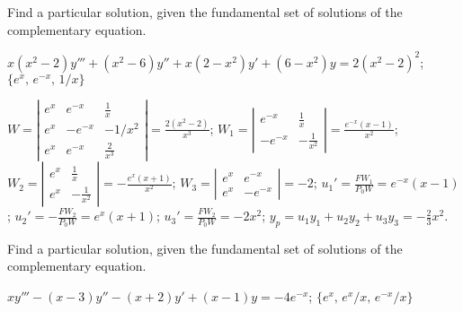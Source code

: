 \documentclass{ximera}
\begin{document}
\begin{problem}\label{exer:9.4.6}
Find a particular
solution, given the fundamental set of solutions of the complementary equation.

$x(x^2-2)y'''+(x^2-6)y''+x(2-x^2)y'+(6-x^2)y=2(x^2-2)^2$; \quad
 $\{e^x,\,e^{-x},\,1/x\}$

\begin{solution}
$W=\left|\begin{array}{cccc}
e^x&e^{-x}&\frac{1}{x}\\
e^x&-e^{-x}&-{1/x^2}\\e^x&e^{-x}&\frac{2}{x^3}
\end{array}\right|=\frac{2(x^2-2)}{x^3}$;
$W_1=\left|\begin{array}{cccc}
e^{-x}&\frac{1}{x}\\-e^{-x}&-\frac{1}{x^2}
\end{array}\right|=\frac{e^{-x}(x-1)}{x^2}$;
$W_2=\left|\begin{array}{cccc}
e^x&\frac{1}{x}\\e^x&-\frac{1}{x^2}
\end{array}\right|=-\frac{e^x(x+1)}{x^2}$;
$W_3=\left|\begin{array}{cccc}
e^x&e^{-x}\\e^x&-e^{-x}
\end{array}\right|=-2$;
$u_1'=\frac{FW_1}{P_0W}=e^{-x}(x-1)$;
$u_2'=-\frac{FW_2}{P_0W}=e^x(x+1)$;
$u_3'=\frac{FW_2}{P_0W}=-2x^2$;
$y_p=u_1y_1+u_2y_2+u_3y_3=-\frac{2}{3}x^2$. 
\end{solution}
\end{problem}

\begin{problem}\label{exer:9.4.7}
Find a particular
solution, given the fundamental set of solutions of the complementary equation.

$xy'''-(x-3)y''-(x+2)y'+(x-1)y=-4e^{-x}$; \quad
$\{e^x,\,e^x/x,\,e^{-x}/x\}$
\end{problem}
\end{document}

